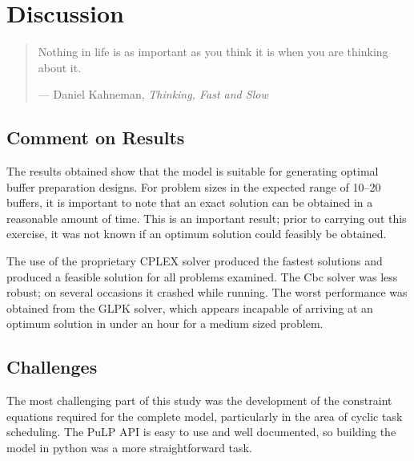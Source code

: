 %
%
%
%

\chapter{Discussion}\label{C.discussion}

\begin{quote}
Nothing in life is as important as you think it is when you are thinking about
it.

\hspace{2cm}--- Daniel Kahneman,
\emph{Thinking, Fast and Slow}
\end{quote}

\section{Comment on Results}\label{S.rescomment}
The results obtained show that the model is suitable for generating optimal
buffer preparation designs.
For problem sizes in the expected range of 10--20 buffers, it is important to
note that an exact solution can be obtained in a reasonable amount of time.
This is an important result; prior to carrying out this exercise, it was not
known if an optimum solution could feasibly be obtained.

The use of the proprietary CPLEX solver produced the fastest solutions and
produced a feasible solution for all problems examined.
The Cbc solver was less robust; on several occasions it crashed while running.
The worst performance was obtained from the GLPK solver, which appears incapable
of arriving at an optimum solution in under an hour for a medium sized problem.

\section{Challenges}\label{S.challenges}
The most challenging part of this study was the development of the constraint
equations required for the complete model, particularly in the area of cyclic
task scheduling.  The PuLP API is easy to use and well documented, so building
the model in python was a more straightforward task.

